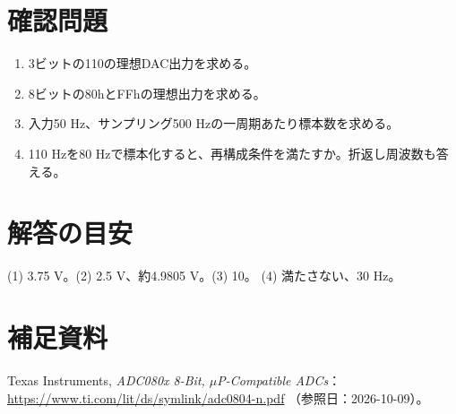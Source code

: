 \documentclass[lualatex,a4paper,10pt]{jlreq}
\begin{document}
\clearpage
\section{確認問題}\label{sec:auto9}
\begin{enumerate}
\item 3ビットの110の理想DAC出力を求める。\answerline
\item 8ビットの80hとFFhの理想出力を求める。\answerline
\item 入力50 Hz、サンプリング500 Hzの一周期あたり標本数を求める。\answerline
\item 110 Hzを80 Hzで標本化すると、再構成条件を満たすか。折返し周波数も答える。\answerline
\end{enumerate}
\section*{解答の目安}\label{sec:auto10}
(1) 3.75 V。(2) 2.5 V、約4.9805 V。(3) 10。
(4) 満たさない、30 Hz。
\section*{補足資料}\label{sec:auto11}
Texas Instruments, \textit{ADC080x 8-Bit, $\mu$P-Compatible ADCs}：
\url{https://www.ti.com/lit/ds/symlink/adc0804-n.pdf}
（参照日：2026-10-09）。
\prelabclosing
\end{document}
